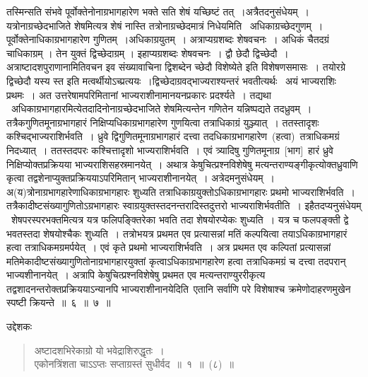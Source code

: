 \documentclass[11pt, openany]{book}
\begin{document}
\newpage
\thispagestyle{fancy}
\fancyhf{}
\noindent
तस्मिन्सति संभवे पूर्वोक्तेनोनाग्रभागहारेण भक्ते सति शेषं यच्छिष्टं तत्~।अत्रैतदनुसंधेयम्~। यत्रोनाग्रच्छेदभाजिते शेषमित्यत्र शेषं नास्ति तत्रोनाग्रच्छेदमात्रं निधेयमिति \textendash\ अधिकाग्रच्छेदगुणम्~। पूर्वोक्तेनाधिकाग्रभागहारेण गुणितम्~।अधिकाग्रयुतम्~। अत्राप्यग्रशब्दः शेषवचनः~। अधिकं चैतदग्रं चाधिकाग्रम् । तेन युक्तं द्विच्छेदाग्रम् । इहाप्यग्रशब्दः शेषवचनः~। द्वौ छेदौ द्विच्छेदौ~।अत्राष्टादशपुराणानामितिवचन इव संख्यावाचिना द्विशब्देन च्छेदौ विशेष्येते इति विशेषणसमासः~। तयोरग्रे द्विच्छेदौ यस्य स्त इति मत्वर्थीयोऽच्प्रत्ययः~।द्विच्छेदाग्रवद्भाज्यराश्यन्तरं भवतीत्यर्थः \textendash\ अयं भाज्यराशिः प्रथमः~। अत उत्तरेषामपरिमितानां भाज्यराशीनामानयनप्रकारः प्रदर्श्यते~। तद्यथा \textendash\ अधिकाग्रभागहारमित्येतदादिनोनाग्रच्छेदभाजिते शेषमित्यन्तेन गणितेन यन्निष्पद्यते तदध्रुवम्~। तत्रैकगुणितमूनाग्रभागहारं निक्षिप्यधिकाग्रभागहारेण गुणयित्वा तत्राधिकाग्रं युञ्ज्यात्~। ततस्तादृशः कश्चिद्भाज्यराशिर्भवति~। ध्रुवे द्विगुणितमूनाग्रभागहारं दत्त्वा तदधिकाग्रभागहारेण~(हत्वा)~तत्राधिकमग्रं निदध्यात्~। ततस्तदपरः कश्चित्तादृशो भाज्यराशिर्भवति~। एवं त्र्यादिषु गुणितमूनाग्र~[भाग]~हारं ध्रुवे निक्षिप्योक्तप्रक्रियया
भाज्यराशिसहस्रमानयेत्~। अथात्र केषुचित्प्रश्नविशेषेषु मत्यन्तराण्यङ्गीकृत्योक्तध्रुवाणि
कृत्वा तद्वशेनाप्युक्तप्रक्रिययाऽपरिमितान् भाज्यराशीनानयेत्~। अत्रेदमनुसंधेयम्~। अ(य)त्रोनाग्रभागहारेणाधिकाग्रभागहारः शुध्यति तत्राधिकाग्रयुक्तोऽधिकाग्रभागहारः प्रथमो भाज्यराशिर्भवति~। तत्रैकादीष्टसंख्यागुणितोऽग्रभागहारः स्वाग्रयुक्तस्तदनन्तरादिस्तदुत्तरो भाज्यराशिर्भवतीति~। इहैतदप्यनुसंधेयम् \textendash\ शेषपरस्परभक्तमित्यत्र यत्र फलिपङ्क्तिरेका भवति तदा शेषयोरप्येकः
शुध्यति~। यत्र च फलपङ्क्ती द्वे भवतस्तदा शेषयोश्चैकः शुध्यति~। तत्रोभयत्र प्रथमत एव प्रत्यासन्नां मतिं कल्पयित्वा तयाऽधिकाग्रभागहारं हत्वा तत्राधिकमग्रमर्पयेत्~। एवं कृते प्रथमो भाज्यराशिर्भवति~। अत्र प्रथमत एव कल्पितां प्रत्यासन्नां मतिमेकादीष्टसंख्यागुणितोनाग्रभागहारयुक्तां कृत्वाऽधिकाग्रभागहारेण हत्वा तत्राधिकमग्रं च दत्त्वा तदपरान् भाज्यशीनानयेत्~। अत्रापि केषुचित्प्रश्नविशेषेषु प्रथमत एव मत्यन्तराण्युररीकृत्य तद्वशादनन्तरोक्तप्रक्रिययाऽन्यानपि भाज्यराशीनानयेदिति\textendash\  एतानि सर्वाणि परे विशेषाश्च क्रमेणोदाहरणमुखेन स्पष्टी क्रियन्ते~॥~६~॥~७~॥

\newpage
\thispagestyle{fancy}
\fancyhf{}

उद्देशकः \textendash 
\begin{quote}
{\ku अष्टादशभिरेकाग्रो यो भवेद्राशिरुद्धृतः~।\\
एकोनत्रिंशता चाऽऽप्तः सप्ताग्रस्तं सुधीर्वद~॥~१~॥~(८)~॥}
\end{quote}
\end{document}
